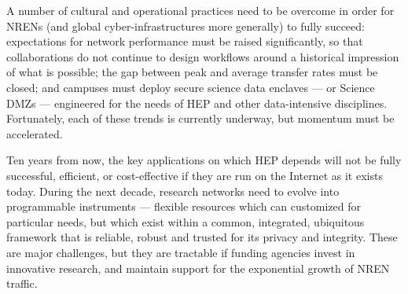 A number of cultural and operational practices need to be overcome in order for NRENs (and global cyber-infrastructures more generally) to fully succeed: expectations for network performance must be raised significantly, so that collaborations do not continue to design workflows around a historical impression of what is possible; the gap between peak and average transfer rates must be closed; and campuses must deploy secure science data enclaves –-- or  Science DMZs\cite{DMZ} –-- engineered for the needs of HEP and other data-intensive disciplines.  Fortunately, each of these trends is currently underway, but momentum must be accelerated.   

Ten years from now, the key applications on which HEP depends will not be fully successful, efficient, or cost-effective if they are run on the Internet as it exists today. During the next decade, research networks need to evolve into programmable instruments –-- flexible resources which can customized for particular needs, but which exist within a common, integrated, ubiquitous framework that is reliable, robust and trusted for its privacy and integrity. These are major challenges, but they are tractable if funding agencies invest in innovative research, and maintain support for the exponential growth of NREN traffic. 

